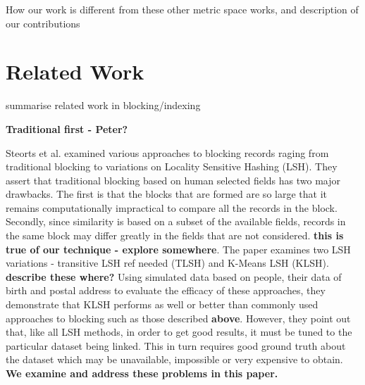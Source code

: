 \documentclass{llncs}
\begin{document}
How our work is different from these other metric space works, and
description of our contributions

\iffalse  %
The motivation for this work is the Digitising Scotland project (Dibben 2012), which is in the process of transcribing and linking all the vital events recorded in Scotland between 1856 and 1977. This data set will, when complete, include around 14 million birth records, 11 million death records and 4 million marriage records. As part of the work, certain data fields (locations, occupations and causes of death) are also being classified to the relevant standard coding schemes.
\fi  %


\section{Related Work}
\label{sec-related}

summarise related work in blocking/indexing

\textbf{Traditional first - Peter?}

Steorts et al. \cite{Steorts2014} examined various approaches to blocking records raging from traditional blocking to variations on Locality Sensitive Hashing (LSH). They assert that traditional blocking based on human selected fields has two major drawbacks. The first is that the blocks that are formed are so large that it remains computationally impractical to compare all the records in the block. Secondly, since similarity is based on a subset of the available fields, records in the same block may differ greatly in the fields that are not considered. \textbf{{this is true of our technique - explore somewhere}}. The paper examines two LSH variations - transitive LSH {ref needed} (TLSH) and K-Means LSH (KLSH). {\textbf{describe these where?}} 
Using simulated data based on people, their data of birth and postal address to evaluate the efficacy of these approaches, they demonstrate that KLSH performs as well or better than commonly used approaches to blocking such as those described \textbf{above}. However, they point out that, like all LSH methods, in order to get good results, it must be tuned to the particular dataset being linked. This in turn requires good ground truth about the dataset which may be unavailable, impossible or very expensive to obtain. \textbf{We examine and address these problems in this paper.}
\end{document}
